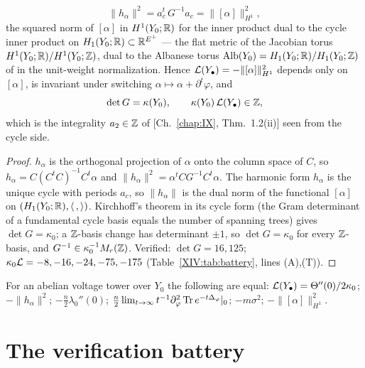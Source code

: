 \begin{theorem}\label{XIV:thm:albanese}
\[
\|h_\alpha\|^{2}=a_c^{t}\,G^{-1}a_c=\bigl\|[\alpha]\bigr\|^{2}_{H^{1}},
\]
the squared norm of $[\alpha]$ in $H^{1}(Y_0;\mathbb{R})$ for the inner product dual to the cycle
inner product on $H_1(Y_0;\mathbb{R})\subset\mathbb{R}^{E^{+}}$ --- the flat metric of the Jacobian torus
$H^{1}(Y_0;\mathbb{R})/H^{1}(Y_0;\mathbb{Z})$, dual to the Albanese torus
$\operatorname{Alb}(Y_0)=H_1(Y_0;\mathbb{R})/H_1(Y_0;\mathbb{Z})$ of \cite{KS2} in the unit-weight normalization. Hence
$\mathcal{L}(Y_\bullet)=-\|[\alpha]\|^{2}_{H^{1}}$ depends only on $[\alpha]$, is invariant under
switching $\alpha\mapsto\alpha+\partial^{t}\varphi$, and
\[
\det G=\kappa(Y_0),\qquad \kappa(Y_0)\,\mathcal{L}(Y_\bullet)\in\mathbb{Z} ,
\]
which is the integrality $a_2\in\mathbb{Z}$ of {\rm[Ch.~\ref{chap:IX}, Thm.~1.2(ii)]} seen from the cycle side.
\end{theorem}

\begin{proof}
$h_\alpha$ is the orthogonal projection of $\alpha$ onto the column space of $C$, so
$h_\alpha=C(C^{t}C)^{-1}C^{t}\alpha$ and $\|h_\alpha\|^{2}=\alpha^{t}CG^{-1}C^{t}\alpha$. The
harmonic form $h_\alpha$ is the unique cycle with periods $a_c$, so $\|h_\alpha\|$ is the
dual norm of the functional $[\alpha]$ on $(H_1(Y_0;\mathbb{R}),\langle\,,\rangle)$. Kirchhoff's
theorem in its cycle form (the Gram determinant of a fundamental cycle basis equals the
number of spanning trees) gives $\det G=\kappa_0$; a $\mathbb{Z}$-basis change has determinant $\pm1$,
so $\det G=\kappa_0$ for every $\mathbb{Z}$-basis, and $G^{-1}\in\kappa_0^{-1}M_r(\mathbb{Z})$. Verified:
$\det G=16,125$; $\kappa_0\mathcal{L}=-8,-16,-24,-75,-175$ (Table~\ref{XIV:tab:battery}, lines (A),(T)).
\end{proof}

\begin{corollary}\label{XIV:cor:faces}
For an abelian voltage tower over $Y_0$ the following are equal:
$\mathcal{L}(Y_\bullet)=\Theta''(0)/2\kappa_0$; $-\|h_\alpha\|^{2}$; $-\frac n2\lambda_0''(0)$;
$\frac n2\lim_{t\to\infty}t^{-1}\partial^{2}_\varphi\operatorname{Tr} e^{-t\Delta_\varphi}|_0$;
$-m\sigma^{2}$; $-\|[\alpha]\|^{2}_{H^{1}}$.
\end{corollary}

\section{The verification battery}\label{XIV:sec:battery}

